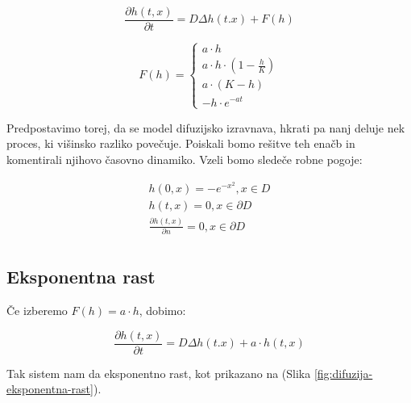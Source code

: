 \documentclass[a4paper, oneside, 12pt]{book}
\begin{document}
            \begin{equation}
              \frac{ \partial h(t,x) }{ \partial t} = D \Delta h(t.x) + F(h)
              \label{difuzija-splosna}
            \end{equation}

          \begin{equation}
            F(h) = \left \{ \begin{array}{lr} 
            a \cdot h \\
            a \cdot h \cdot (1 - \frac{h}{K}) \\
            a \cdot (K - h) \\
            - h \cdot e^{-a t}
            \end{array} \right. 
            \label{difuzijska-variacije}
          \end{equation}

          Predpostavimo torej, da se model difuzijsko izravnava, hkrati pa nanj deluje nek proces, ki višinsko razliko povečuje. Poiskali bomo rešitve teh enačb in komentirali njihovo časovno dinamiko. 
          Vzeli bomo sledeče robne pogoje:

        \begin{equation}
          \begin{aligned}
            h(0,x) =  - e^{-x^2}, x \in D \\
            h(t,x) = 0, x \in \partial D \\
            \frac{\partial h(t,x)}{\partial n} = 0, x \in \partial D \\
          \end{aligned}
        \end{equation}


          \subsection{Eksponentna rast}

          Če izberemo $F(h) = a \cdot h$, dobimo:

            \begin{equation}
              \frac{ \partial h(t,x) }{ \partial t} = D \Delta h(t.x) + a \cdot h(t,x)
              \label{difuzija-eksponentna-rast}
            \end{equation}

            Tak sistem nam da eksponentno rast, kot prikazano na (Slika \ref{fig:difuzija-eksponentna-rast}).
\end{document}
